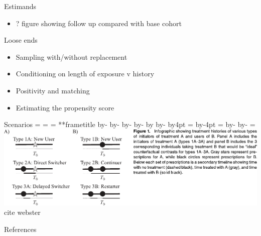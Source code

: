 \documentclass[aspectratio=169,12pt]{beamer} %
\makeatletter
\newif\ifsidebartheme
\newcommand*{\calculatespace}{%
    \contentheight=\paperheight%
    \ifx\beamer@frametitle\@empty%
        \setbox\@tempboxa=\box\voidb@x%
      \else%
        \setbox\@tempboxa=\vbox{%
          \vbox{}%
          {\parskip0pt\usebeamertemplate***{frametitle}}%
        }%
        \ifsidebartheme%
          \advance\contentheight by-1em%
        \fi%
      \fi%
    \advance\contentheight by-\ht\@tempboxa%
    \advance\contentheight by-\dp\@tempboxa%
    \advance\contentheight by-\beamer@frametopskip%
    \ifbeamer@plainframe%
    \contentbottom=0pt%
    \else%
    \advance\contentheight by-\headheight%
    \advance\contentheight by\headdp%
    \advance\contentheight by-\footheight%
    \advance\contentheight by4pt%
    \contentbottom=\footheight%
    \advance\contentbottom by-4pt%
    \fi%
    \contentwidth=\paperwidth%
    \ifbeamer@plainframe%
    \contentleft=0pt%
    \else%
    \advance\contentwidth by-\beamer@rightsidebar%
    \advance\contentwidth by-\beamer@leftsidebar\relax%
    \contentleft=\beamer@leftsidebar%
    \fi%
}
\makeatother
\begin{document}
\begin{frame}{Estimands}
    \begin{itemize}
	\item ? figure showing follow up compared with base cohort
    \end{itemize}
\end{frame}

\begin{frame}{Loose ends}
    \begin{itemize}
	\item Sampling with/without replacement
	\item Conditioning on length of exposure v history
	\item Positivity and matching
	\item Estimating the propensity score
    \end{itemize}
\end{frame}

\begin{frame}{Scenarios}
    \calculatespace%
	\includegraphics[width=0.85\contentwidth]{ref/webster-fig1.pdf}
    cite webster
\end{frame}


\begin{frame}{References}
%        
\end{frame}
\end{document}
